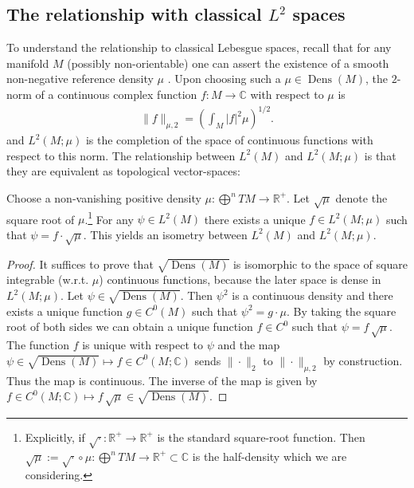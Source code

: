 \documentclass[final,leqno]{siamltex1213}
\DeclareMathOperator{\Dens}{Dens}
\begin{document}
\subsection{The relationship with classical $L^{2}$ spaces}
\label{sec:classical_Lebesgue}
To understand the relationship to classical Lebesgue spaces, recall that for any manifold $M$ (possibly non-orientable) one can assert the existence of a smooth non-negative reference density $\mu$ \cite[Chapter 16]{Lee2006}.
Upon choosing such a $\mu \in \Dens(M)$, the $2$-norm of a continuous complex function $f:M \to \mathbb{C}$ with respect to $\mu$ is
\begin{align}
	\| f \|_{\mu,2} =  \left( \int_M |f|^2 \mu \right)^{1/2}.
\end{align}
and $L^2(M ; \mu)$ is the completion of the space of continuous functions with respect to this norm.
The relationship between $L^{2}(M)$ and $L^{2}(M;\mu)$ is that they are equivalent as topological vector-spaces:
\begin{proposition} \label{prop:non canonical}
	Choose a non-vanishing positive density $\mu : \bigoplus^{n}TM \to \mathbb{R}^{+}$.
	Let $\sqrt{\mu}$ denote the square root of $\mu$.\footnote{Explicitly, if $\sqrt{\cdot}: \mathbb{R}^{+} \to \mathbb{R}^{+}$ is the standard square-root function.
	Then $\sqrt{\mu} := \sqrt{\cdot} \circ \mu : \bigoplus^{n} TM \to \mathbb{R}^{+} \subset \mathbb{C}$ is the half-density which we are considering.}
	For any $\psi \in L^2(M)$ there exists a unique $f \in L^2(M ; \mu)$ such that $\psi = f \cdot  \sqrt{\mu}$.
	This yields an isometry between $L^2(M)$ and $L^2(M ; \mu)$.
\end{proposition}
\begin{proof}
	It suffices to prove that $\sqrt{\Dens(M)}$ is isomorphic to the space of square integrable (w.r.t. $\mu$) continuous functions, because
	the later space is dense in $L^{2}(M;\mu)$.
	Let $\psi \in \sqrt{\Dens(M)}$.  Then $\psi^2$ is a continuous density and there exists a unique function $g \in C^{0}(M)$ such that $\psi^{2} = g \cdot \mu$.
	By taking the square root of both sides we can obtain a unique function $f \in C^{0}$ such that $\psi = f\, \sqrt{\mu}$.
	The function $f$ is unique with respect to $\psi$ and
	the map $\psi \in \sqrt{\Dens(M)} \mapsto f \in C^0(M ; \mathbb{C} )$ sends $\| \cdot \|_{2}$ to $\| \cdot \|_{\mu,2}$ by construction.
	Thus the map is continuous.
	The inverse of the map is given by $f \in C^{0}(M;\mathbb{C}) \mapsto f \, \sqrt{\mu} \in \sqrt{\Dens(M)}$.
\end{proof}
\end{document}

